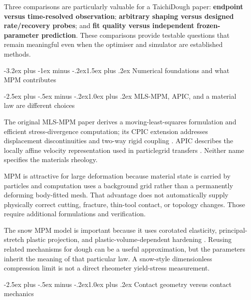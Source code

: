 \documentclass[
  11pt,
]{article}
\makeatletter
\renewcommand\section{\needspace{7\baselineskip}\@startsection{section}{1}{\z@}%
  {-3.2ex plus -1ex minus -.2ex}{1.5ex plus .2ex}%
  {\normalfont\sffamily\Large\bfseries\color{accent}}}
\renewcommand\subsection{\needspace{5\baselineskip}\@startsection{subsection}{2}{\z@}%
  {-2.5ex plus -.5ex minus -.2ex}{1.0ex plus .2ex}%
  {\normalfont\sffamily\large\bfseries\color{accent}}}
\makeatother
\begin{document}
Three comparisons are particularly valuable for a TaichiDough paper:
\textbf{endpoint versus time-resolved observation}; \textbf{arbitrary
shaping versus designed rate/recovery probes}; and \textbf{fit quality
versus independent frozen-parameter prediction}. These comparisons
provide testable questions that remain meaningful even when the
optimiser and simulator are established methods.

\section{Numerical foundations and what MPM
contributes}\label{numerical-foundations-and-what-mpm-contributes}

\subsection{MLS-MPM, APIC, and a material law are different
choices}\label{mls-mpm-apic-and-a-material-law-are-different-choices}

The original MLS-MPM paper derives a moving-least-squares formulation
and efficient stress-divergence computation; its CPIC extension
addresses displacement discontinuities and two-way rigid coupling
. APIC describes the locally affine
velocity representation used in particle\textendash{}\allowbreak{}grid
transfers . Neither name specifies the
material\textquotesingle s rheology.

MPM is attractive for large deformation because material state is
carried by particles and computation uses a background grid rather than
a permanently deforming body-fitted mesh. That advantage does not
automatically supply physically correct cutting, fracture, thin-tool
contact, or topology changes. Those require additional formulations and
verification.

The snow MPM model is important because it uses corotated elasticity,
principal-stretch plastic projection, and plastic-volume-dependent
hardening . Reusing related mechanisms
for dough can be a useful approximation, but the parameters inherit the
meaning of that particular law. A snow-style dimensionless compression
limit is not a direct rheometer yield-stress measurement.

\subsection{Contact geometry versus contact
mechanics}\label{contact-geometry-versus-contact-mechanics}
\end{document}
